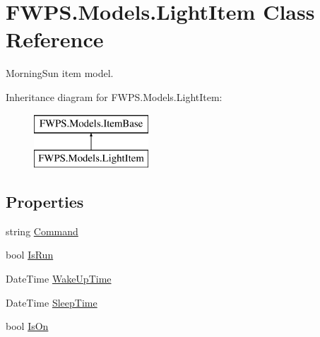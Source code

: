 \hypertarget{class_f_w_p_s_1_1_models_1_1_light_item}{}\section{F\+W\+P\+S.\+Models.\+Light\+Item Class Reference}
\label{class_f_w_p_s_1_1_models_1_1_light_item}


Morning\+Sun item model.  


Inheritance diagram for F\+W\+P\+S.\+Models.\+Light\+Item\+:\begin{figure}[H]
\begin{center}
\leavevmode
\includegraphics[height=2.000000cm]{class_f_w_p_s_1_1_models_1_1_light_item}
\end{center}
\end{figure}
\subsection*{Properties}
\begin{DoxyCompactItemize}
\item 
string \mbox{\hyperlink{class_f_w_p_s_1_1_models_1_1_light_item_a556da31418891de8a7ad131d1839bb73}{Command}}
\item 
bool \mbox{\hyperlink{class_f_w_p_s_1_1_models_1_1_light_item_a7db0ff95678c1a36e03656e148ab2b71}{Is\+Run}}
\item 
Date\+Time \mbox{\hyperlink{class_f_w_p_s_1_1_models_1_1_light_item_a036c7595045c3e195292ef9ac4c13d02}{Wake\+Up\+Time}}
\item 
Date\+Time \mbox{\hyperlink{class_f_w_p_s_1_1_models_1_1_light_item_ab5b14473fcb70a62e2d33fcd7a0c176d}{Sleep\+Time}}
\item 
bool \mbox{\hyperlink{class_f_w_p_s_1_1_models_1_1_light_item_ab9478547c159d572ada2b8da4d6ed108}{Is\+On}}
\end{DoxyCompactItemize}
